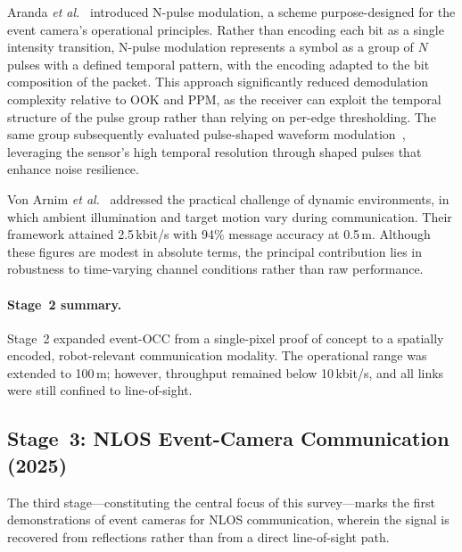 \documentclass[10pt,a4paper]{article}
\newcommand{\stage}[1]{\textbf{Stage~#1}}
\begin{document}
Aranda \emph{et al.}~\cite{aranda2024npulse} introduced N-pulse
modulation, a scheme purpose-designed for the event camera's operational
principles. Rather than encoding each bit as a single intensity
transition, N-pulse modulation represents a symbol as a group of $N$
pulses with a defined temporal pattern, with the encoding adapted to
the bit composition of the packet. This approach significantly reduced
demodulation complexity relative to OOK and PPM, as the receiver can
exploit the temporal structure of the pulse group rather than relying
on per-edge thresholding. The same group subsequently evaluated
pulse-shaped waveform modulation~\cite{aranda2025pulseshaped}, leveraging
the sensor's high temporal resolution through shaped pulses that
enhance noise resilience.

Von Arnim \emph{et al.}~\cite{vonarnim2024dynamic} addressed the
practical challenge of dynamic environments, in which ambient
illumination and target motion vary during communication. Their
framework attained 2.5\,kbit/s with 94\% message accuracy at 0.5\,m.
Although these figures are modest in absolute terms, the principal
contribution lies in robustness to time-varying channel conditions rather
than raw performance.

\paragraph{Stage~2 summary.}
Stage~2 expanded event-OCC from a single-pixel proof of concept to a
spatially encoded, robot-relevant communication modality. The
operational range was extended to 100\,m; however, throughput remained
below 10\,kbit/s, and all links were still confined to line-of-sight.

\subsection{\stage{3}: NLOS Event-Camera Communication (2025)}
\label{sec:stage3}

The third stage---constituting the central focus of this survey---marks
the first demonstrations of event cameras for NLOS communication,
wherein the signal is recovered from reflections rather than from a
direct line-of-sight path.
\end{document}
